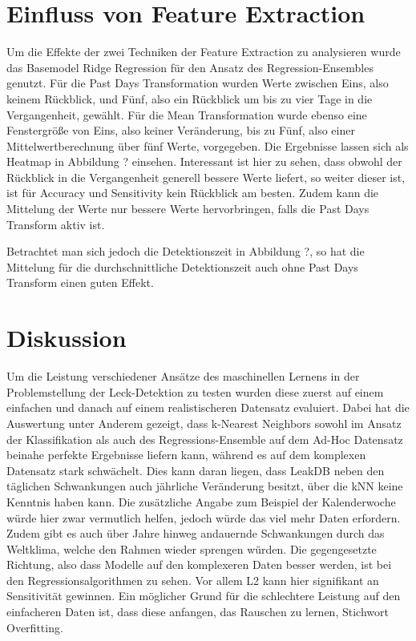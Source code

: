 \section{Einfluss von Feature Extraction}

Um die Effekte der zwei Techniken der Feature Extraction zu analysieren wurde das Basemodel Ridge Regression
 für den Ansatz des Regression-Ensembles genutzt. Für die Past Days Transformation wurden Werte zwischen Eins,
 also keinem Rückblick, und Fünf, also ein Rückblick um bis zu vier Tage in die Vergangenheit, gewählt. Für
 die Mean Transformation wurde ebenso eine Fenstergröße von Eins, also keiner Veränderung, bis zu Fünf, also
 einer Mittelwertberechnung über fünf Werte, vorgegeben. Die Ergebnisse lassen sich als Heatmap in
 Abbildung ? einsehen. Interessant ist hier zu sehen, dass obwohl der Rückblick in die Vergangenheit generell
 bessere Werte liefert, so weiter dieser ist, ist für Accuracy und Sensitivity kein Rückblick am besten. Zudem
 kann die Mittelung der Werte nur bessere Werte hervorbringen, falls die Past Days Transform aktiv ist.

 Betrachtet man sich jedoch die Detektionszeit in Abbildung ?, so hat die Mittelung für die
  durchschnittliche Detektionszeit auch ohne Past Days Transform einen guten Effekt.

\section{Diskussion \label{Chapter-Discussion}}

Um die Leistung verschiedener Ansätze des maschinellen Lernens in der Problemstellung der Leck-Detektion zu
 testen wurden diese zuerst auf einem einfachen und danach auf einem realistischeren Datensatz evaluiert. Dabei
 hat die Auswertung unter Anderem gezeigt, dass k-Nearest Neighbors sowohl im Ansatz der Klassifikation als auch
 des Regressions-Ensemble auf dem Ad-Hoc Datensatz beinahe perfekte Ergebnisse liefern kann, während es auf dem
 komplexen Datensatz stark schwächelt. Dies kann daran liegen, dass LeakDB neben den täglichen Schwankungen
 auch jährliche Veränderung besitzt, über die kNN keine Kenntnis haben kann. Die zusätzliche Angabe zum Beispiel
 der Kalenderwoche würde hier zwar vermutlich helfen, jedoch würde das viel mehr Daten erfordern. Zudem gibt es
 auch über Jahre hinweg andauernde Schwankungen durch das Weltklima, welche den Rahmen wieder sprengen würden.
 Die gegengesetzte Richtung, also dass Modelle auf den komplexeren Daten besser werden, ist bei den
 Regressionsalgorithmen zu sehen. Vor allem L2 kann hier signifikant an Sensitivität gewinnen. Ein möglicher
 Grund für die schlechtere Leistung auf den einfacheren Daten ist, dass diese anfangen, das Rauschen zu lernen,
 Stichwort Overfitting.

